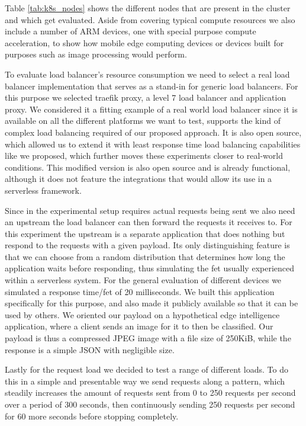 

Table \ref{tab:k8s_nodes} shows the different nodes that are present in the cluster and which get evaluated. Aside from covering typical compute resources we also include a number of ARM devices, one with special purpose compute acceleration, to show how mobile edge computing devices or devices built for purposes such as image processing would perform.

To evaluate load balancer's resource consumption we need to select a real load balancer implementation that serves as a stand-in for generic load balancers.
For this purpose we selected traefik proxy\cite{traefik}, a level 7 load balancer and application proxy.
We considered it a fitting example of a real world load balancer since it is available on all the different platforms we want to test, supports the kind of complex load balancing required of our proposed approach.
It is also open source, which allowed us to extend it with least response time load balancing capabilities like we proposed, which further moves these experiments closer to real-world conditions.
This modified version\cite{traefik-jjnp} is also open source and is already functional, although it does not feature the integrations that would allow its use in a serverless framework.

Since in the experimental setup requires actual requests being sent we also need an upstream the load balancer can then forward the requests it receives to.
For this experiment the upstream is a separate application that does nothing but respond to the requests with a given payload.
Its only distinguishing feature is that we can choose from a random distribution that determines how long the application waits before responding, thus simulating the \gls{fet} usually experienced within a serverless system.
For the general evaluation of different devices we simulated a response time/\gls{fet} of 20 milliseconds.
We built this application specifically for this purpose, and also made it publicly available\cite{palecekResponder2021} so that it can be used by others.
We oriented our payload on a hypothetical edge intelligence application, where a client sends an image for it to then be classified.
Our payload is thus a compressed JPEG image with a file size of 250KiB, while the response is a simple JSON with negligible size.

Lastly for the request load we decided to test a range of different loads.
To do this in a simple and presentable way we send requests along a pattern, which steadily increases the amount of requests sent from 0 to 250 requests per second over a period of 300 seconds, then continuously sending 250 requests per second for 60 more seconds before stopping completely.

